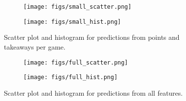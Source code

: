 \documentclass{article}
\begin{document}
\begin{figure}[h!]
\centering
\begin{subfigure}{.5\textwidth}
  \centering
  \texttt{[image: figs/small\_scatter.png]}
  \caption{}
  \label{fig:small1}
\end{subfigure}%
\begin{subfigure}{.5\textwidth}
  \centering
  \texttt{[image: figs/small\_hist.png]}
  \caption{}
  \label{fig:small2}
\end{subfigure}
\caption{Scatter plot and histogram for predictions from points and takeaways per game.}
\label{fig:small}
\end{figure}

\begin{figure}[t!]
\centering
\begin{subfigure}{.5\textwidth}
  \centering
  \texttt{[image: figs/full\_scatter.png]}
  \caption{}
  \label{fig:full1}
\end{subfigure}%
\begin{subfigure}{.5\textwidth}
  \centering
  \texttt{[image: figs/full\_hist.png]}
  \caption{}
  \label{fig:full2}
\end{subfigure}
\caption{Scatter plot and histogram for predictions from all features.}
\label{fig:full}
\end{figure}


\end{document}
